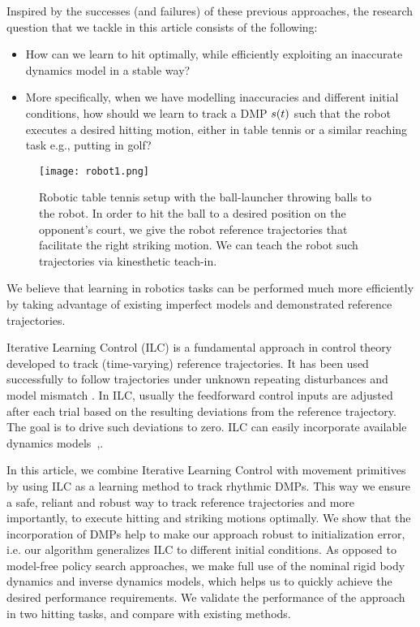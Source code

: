 Inspired by the successes (and failures) of these previous approaches, the research question that we tackle in this article consists of the following:
%
\begin{itemize}
\item How can we learn to hit optimally, while efficiently exploiting an inaccurate dynamics model in a stable way?
%
\item More specifically, when we have modelling inaccuracies and different initial conditions, how should we learn to track a DMP $s(t)$ such that the robot executes a desired hitting motion, either in table tennis or a similar reaching task e.g., putting in golf?

\end{itemize}
%
\begin{figure}[b!]
\center
\texttt{[image: robot1.png]}			
\caption{Robotic table tennis setup with the ball-launcher throwing balls to the robot. In order to hit the ball to a desired position on the opponent's court, we give the robot reference trajectories that facilitate the right striking motion. We can teach the robot such trajectories via kinesthetic teach-in.}
\label{robot}
\end{figure}
%
\noindent We believe that learning in robotics tasks can be performed much more efficiently by taking advantage of existing imperfect models and demonstrated reference trajectories. 

Iterative Learning Control (ILC) is a fundamental approach in control theory developed to track (time-varying) reference trajectories. It has been used successfully to follow trajectories under unknown repeating disturbances and model mismatch \cite{Bristow06}. In ILC, usually the feedforward control inputs are adjusted after each trial based on the resulting deviations from the reference trajectory. The goal is to drive such deviations to zero. ILC can easily incorporate available dynamics models~\cite{Amann95},\cite{Moore07}.

In this article, we combine Iterative Learning Control with movement primitives by using ILC as a learning method to track rhythmic DMPs. This way we ensure a safe, reliant and robust way to track reference trajectories and more importantly, to execute hitting and striking motions optimally. We show that the incorporation of DMPs help to make our approach robust to initialization error, i.e. our algorithm generalizes ILC to different initial conditions. As opposed to model-free policy search approaches, we make full use of the nominal rigid body dynamics and inverse dynamics models, which helps us to quickly achieve the desired performance requirements. We validate the performance of the approach in two hitting tasks, and compare with existing methods.

